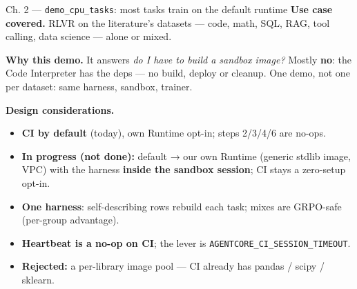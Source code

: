 \documentclass[
  10pt,
  ignorenonframetext,
  aspectratio=169,
  t]{beamer}
\providecommand{\tightlist}{%
  \setlength{\itemsep}{0pt}\setlength{\parskip}{0pt}}
\begin{document}
\begin{frame}{Ch. 2 --- \texttt{demo\_cpu\_tasks}: most tasks
train on the default runtime}
\protect\hypertarget{ch.-2-demo_cpu_tasks-most-tasks-train-on-the-default-runtime}{}
\textbf{Use case covered.} RLVR on the literature's datasets --- code,
math, SQL, RAG, tool calling, data science --- alone or mixed.

\textbf{Why this demo.} It answers \emph{do I have to build a sandbox
image?} Mostly \textbf{no}: the Code Interpreter has the deps --- no
build, deploy or cleanup. One demo, not one per dataset: same harness,
sandbox, trainer.

\textbf{Design considerations.}

\begin{itemize}
\tightlist
\item
  \textbf{CI by default} (today), own Runtime opt-in; steps 2/3/4/6 are
  no-ops.
\item
  \textbf{In progress (not done):} default → our own Runtime (generic
  stdlib image, VPC) with the harness \textbf{inside the sandbox
  session}; CI stays a zero-setup opt-in.
\item
  \textbf{One harness}: self-describing rows rebuild each task; mixes
  are GRPO-safe (per-group advantage).
\item
  \textbf{Heartbeat is a no-op on CI}; the lever is
  \texttt{AGENTCORE\_CI\_SESSION\_TIMEOUT}.
\item
  \textbf{Rejected:} a per-library image pool --- CI already has pandas
  / scipy / sklearn.
\end{itemize}
\end{frame}
\end{document}
